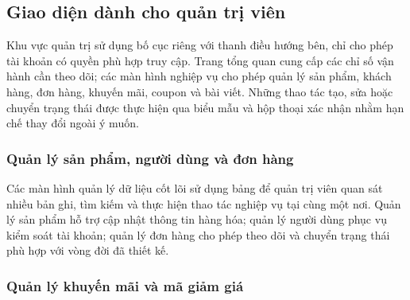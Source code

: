 

\subsection{Giao diện dành cho quản trị viên}

Khu vực quản trị sử dụng bố cục riêng với thanh điều hướng bên, chỉ cho phép tài khoản có quyền phù
hợp truy cập. Trang tổng quan cung cấp các chỉ số vận hành cần theo dõi; các màn hình nghiệp vụ cho
phép quản lý sản phẩm, khách hàng, đơn hàng, khuyến mãi, coupon và bài viết. Những thao tác tạo, sửa
hoặc chuyển trạng thái được thực hiện qua biểu mẫu và hộp thoại xác nhận nhằm hạn chế thay đổi ngoài
ý muốn.


\subsubsection{Quản lý sản phẩm, người dùng và đơn hàng}

Các màn hình quản lý dữ liệu cốt lõi sử dụng bảng để quản trị viên quan sát nhiều bản ghi, tìm kiếm
và thực hiện thao tác nghiệp vụ tại cùng một nơi. Quản lý sản phẩm hỗ trợ cập nhật thông tin hàng
hóa; quản lý người dùng phục vụ kiểm soát tài khoản; quản lý đơn hàng cho phép theo dõi và chuyển
trạng thái phù hợp với vòng đời đã thiết kế.




\subsubsection{Quản lý khuyến mãi và mã giảm giá}

